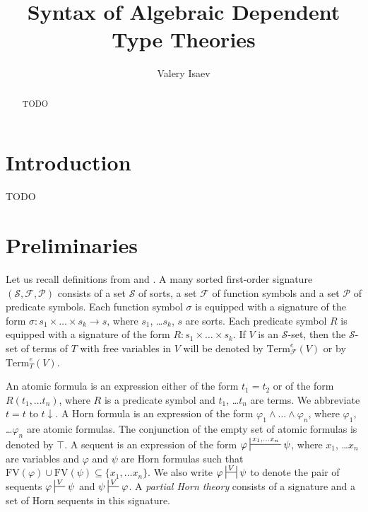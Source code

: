 \documentclass[reqno]{amsart}
\theoremstyle{definition}
\theoremstyle{remark}
\newcommand{\fs}[1]{\mathrm{#1}}
\newcommand{\Term}{\fs{Term}}
\newcommand{\FV}{\fs{FV}}
\numberwithin{figure}{section}
\begin{document}
\title{Syntax of Algebraic Dependent Type Theories}

\author{Valery Isaev}

\begin{abstract}
TODO
\end{abstract}

\maketitle

\section{Introduction}

TODO

\section{Preliminaries}

Let us recall definitions from \cite{PHL} and \cite{alg-tt}.
A many sorted first-order signature $(\mathcal{S},\mathcal{F},\mathcal{P})$ consists of a set $\mathcal{S}$ of sorts,
a set $\mathcal{F}$ of function symbols and a set $\mathcal{P}$ of predicate symbols.
Each function symbol $\sigma$ is equipped with a signature of the form $\sigma : s_1 \times \ldots \times s_k \to s$, where $s_1$, \ldots $s_k$, $s$ are sorts.
Each predicate symbol $R$ is equipped with a signature of the form $R : s_1 \times \ldots \times s_k$.
If $V$ is an $\mathcal{S}$-set, then the $\mathcal{S}$-set of terms of $T$ with free variables in $V$ will be denoted by $\Term^e_\mathcal{F}(V)$ or by $\Term^e_T(V)$.

An atomic formula is an expression either of the form $t_1 = t_2$ or of the form $R(t_1, \ldots t_n)$,
where $R$ is a predicate symbol and $t_1$, \ldots $t_n$ are terms.
We abbreviate $t = t$ to $t\!\downarrow$.
A Horn formula is an expression of the form $\varphi_1 \land \ldots \land \varphi_n$, where $\varphi_1$, \ldots $\varphi_n$ are atomic formulas.
The conjunction of the empty set of atomic formulas is denoted by $\top$.
A sequent is an expression of the form $\varphi \sststile{}{x_1, \ldots x_n} \psi$, where $x_1$, \ldots $x_n$ are variables
and $\varphi$ and $\psi$ are Horn formulas such that $\FV(\varphi) \cup \FV(\psi) \subseteq \{ x_1, \ldots x_n \}$.
We also write $\varphi \ssststile{}{V} \psi$ to denote the pair of sequents $\varphi \sststile{}{V} \psi$ and $\psi \sststile{}{V} \varphi$.
A \emph{partial Horn theory} consists of a signature and a set of Horn sequents in this signature.
\end{document}
